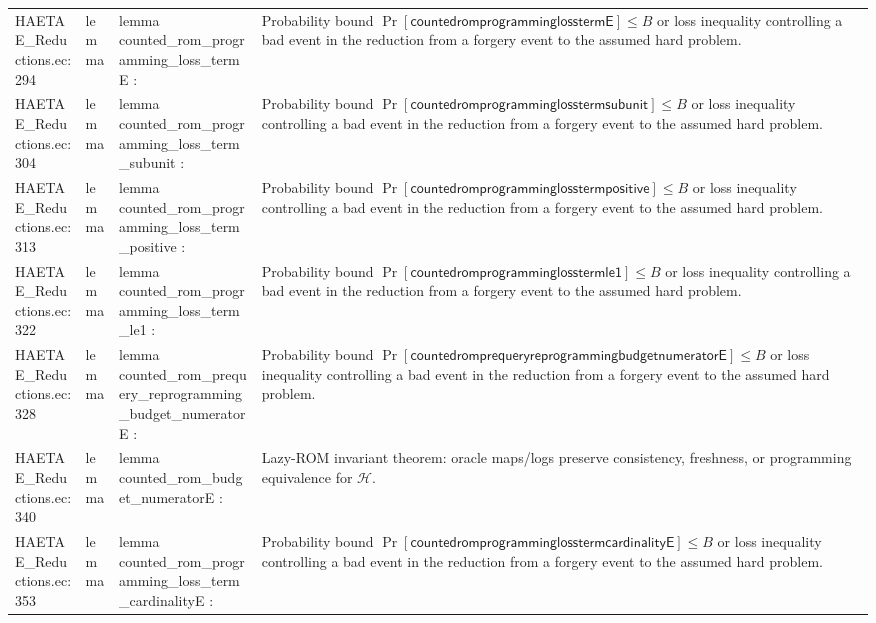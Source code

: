 \documentclass[10pt]{article}
\begin{document}
\begin{longtable}{L{0.11\textwidth}L{0.055\textwidth}L{0.385\textwidth}L{0.41\textwidth}}
HAETAE\_\allowbreak{}Reductions.\allowbreak{}ec:\allowbreak{}294 & lemma & {\ttfamily\scriptsize lemma counted\_\allowbreak{}rom\_\allowbreak{}programming\_\allowbreak{}loss\_\allowbreak{}termE :} & Probability bound $\Pr[\mathsf{countedromprogramminglosstermE}]\le B$ or loss inequality controlling a bad event in the reduction from a forgery event to the assumed hard problem. \\
HAETAE\_\allowbreak{}Reductions.\allowbreak{}ec:\allowbreak{}304 & lemma & {\ttfamily\scriptsize lemma counted\_\allowbreak{}rom\_\allowbreak{}programming\_\allowbreak{}loss\_\allowbreak{}term\_\allowbreak{}subunit :} & Probability bound $\Pr[\mathsf{countedromprogramminglosstermsubunit}]\le B$ or loss inequality controlling a bad event in the reduction from a forgery event to the assumed hard problem. \\
HAETAE\_\allowbreak{}Reductions.\allowbreak{}ec:\allowbreak{}313 & lemma & {\ttfamily\scriptsize lemma counted\_\allowbreak{}rom\_\allowbreak{}programming\_\allowbreak{}loss\_\allowbreak{}term\_\allowbreak{}positive :} & Probability bound $\Pr[\mathsf{countedromprogramminglosstermpositive}]\le B$ or loss inequality controlling a bad event in the reduction from a forgery event to the assumed hard problem. \\
HAETAE\_\allowbreak{}Reductions.\allowbreak{}ec:\allowbreak{}322 & lemma & {\ttfamily\scriptsize lemma counted\_\allowbreak{}rom\_\allowbreak{}programming\_\allowbreak{}loss\_\allowbreak{}term\_\allowbreak{}le1 :} & Probability bound $\Pr[\mathsf{countedromprogramminglosstermle1}]\le B$ or loss inequality controlling a bad event in the reduction from a forgery event to the assumed hard problem. \\
HAETAE\_\allowbreak{}Reductions.\allowbreak{}ec:\allowbreak{}328 & lemma & {\ttfamily\scriptsize lemma counted\_\allowbreak{}rom\_\allowbreak{}prequery\_\allowbreak{}reprogramming\_\allowbreak{}budget\_\allowbreak{}numeratorE :} & Probability bound $\Pr[\mathsf{countedromprequeryreprogrammingbudgetnumeratorE}]\le B$ or loss inequality controlling a bad event in the reduction from a forgery event to the assumed hard problem. \\
HAETAE\_\allowbreak{}Reductions.\allowbreak{}ec:\allowbreak{}340 & lemma & {\ttfamily\scriptsize lemma counted\_\allowbreak{}rom\_\allowbreak{}budget\_\allowbreak{}numeratorE :} & Lazy-ROM invariant theorem: oracle maps/logs preserve consistency, freshness, or programming equivalence for $\mathcal H$. \\
HAETAE\_\allowbreak{}Reductions.\allowbreak{}ec:\allowbreak{}353 & lemma & {\ttfamily\scriptsize lemma counted\_\allowbreak{}rom\_\allowbreak{}programming\_\allowbreak{}loss\_\allowbreak{}term\_\allowbreak{}cardinalityE :} & Probability bound $\Pr[\mathsf{countedromprogramminglosstermcardinalityE}]\le B$ or loss inequality controlling a bad event in the reduction from a forgery event to the assumed hard problem. \\

\end{longtable}
\end{document}
